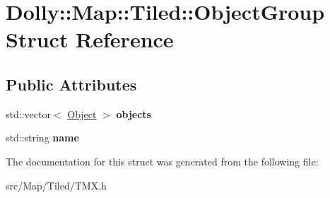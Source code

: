 \hypertarget{struct_dolly_1_1_map_1_1_tiled_1_1_object_group}{}\section{Dolly\+:\+:Map\+:\+:Tiled\+:\+:Object\+Group Struct Reference}
\label{struct_dolly_1_1_map_1_1_tiled_1_1_object_group}
\subsection*{Public Attributes}
\begin{DoxyCompactItemize}
\item 
\mbox{\label{struct_dolly_1_1_map_1_1_tiled_1_1_object_group_ab2f8bd1f2f2fd2031752f9ba186281ef}} 
std\+::vector$<$ \hyperlink{struct_dolly_1_1_map_1_1_tiled_1_1_object}{Object} $>$ {\bfseries objects}
\item 
\mbox{\label{struct_dolly_1_1_map_1_1_tiled_1_1_object_group_a22f70343c3c8daee11a0310d26bb1e69}} 
std\+::string {\bfseries name}
\end{DoxyCompactItemize}


The documentation for this struct was generated from the following file\+:\begin{DoxyCompactItemize}
\item 
src/\+Map/\+Tiled/T\+M\+X.\+h\end{DoxyCompactItemize}

